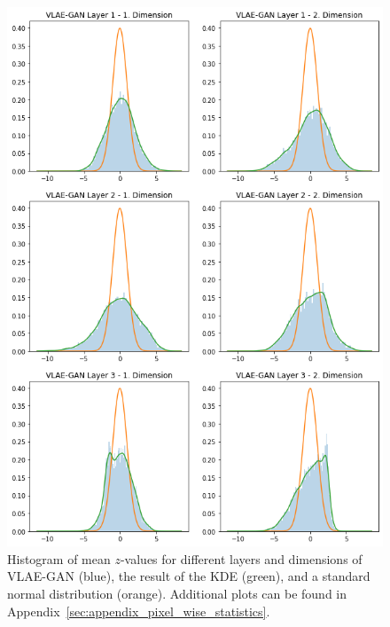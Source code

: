 \begin{figure}
    \centering
    \includegraphics[width=.8\textwidth]{images/generated_vs_true/mnist/vlae_gan_kde.png}
    \caption[\ac{VLAE}-GAN - Latent Space Distribution]{Histogram of mean $z$-values for different layers and dimensions of \ac{VLAE}-\ac{GAN} (blue), the result of the \ac{KDE} (green), and a standard normal distribution (orange). Additional plots can be found in Appendix~\ref{sec:appendix_pixel_wise_statistics}.}
    \label{fig:vlae_gan_kde}
\end{figure}


